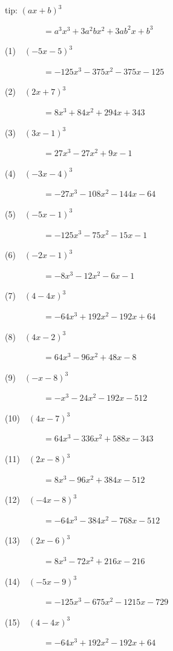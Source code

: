 \documentclass[a4j,twocolumn,10pt,fleqn]{jarticle}
\begin{document}
tip: $\left(a x + b\right)^{3}$

~~~~~~~~~$=a^{3} x^{3} + 3 a^{2} b x^{2} + 3 a b^{2} x + b^{3}$


(1)~~$\left(- 5 x - 5\right)^{3}$

~~~~~~~~~$=- 125 x^{3} - 375 x^{2} - 375 x - 125$

(2)~~$\left(2 x + 7\right)^{3}$

~~~~~~~~~$=8 x^{3} + 84 x^{2} + 294 x + 343$

(3)~~$\left(3 x - 1\right)^{3}$

~~~~~~~~~$=27 x^{3} - 27 x^{2} + 9 x - 1$

(4)~~$\left(- 3 x - 4\right)^{3}$

~~~~~~~~~$=- 27 x^{3} - 108 x^{2} - 144 x - 64$

(5)~~$\left(- 5 x - 1\right)^{3}$

~~~~~~~~~$=- 125 x^{3} - 75 x^{2} - 15 x - 1$

(6)~~$\left(- 2 x - 1\right)^{3}$

~~~~~~~~~$=- 8 x^{3} - 12 x^{2} - 6 x - 1$

(7)~~$\left(4 - 4 x\right)^{3}$

~~~~~~~~~$=- 64 x^{3} + 192 x^{2} - 192 x + 64$

(8)~~$\left(4 x - 2\right)^{3}$

~~~~~~~~~$=64 x^{3} - 96 x^{2} + 48 x - 8$

(9)~~$\left(- x - 8\right)^{3}$

~~~~~~~~~$=- x^{3} - 24 x^{2} - 192 x - 512$

(10)~~$\left(4 x - 7\right)^{3}$

~~~~~~~~~$=64 x^{3} - 336 x^{2} + 588 x - 343$

(11)~~$\left(2 x - 8\right)^{3}$

~~~~~~~~~$=8 x^{3} - 96 x^{2} + 384 x - 512$

(12)~~$\left(- 4 x - 8\right)^{3}$

~~~~~~~~~$=- 64 x^{3} - 384 x^{2} - 768 x - 512$

(13)~~$\left(2 x - 6\right)^{3}$

~~~~~~~~~$=8 x^{3} - 72 x^{2} + 216 x - 216$

(14)~~$\left(- 5 x - 9\right)^{3}$

~~~~~~~~~$=- 125 x^{3} - 675 x^{2} - 1215 x - 729$

(15)~~$\left(4 - 4 x\right)^{3}$

~~~~~~~~~$=- 64 x^{3} + 192 x^{2} - 192 x + 64$
\end{document}
